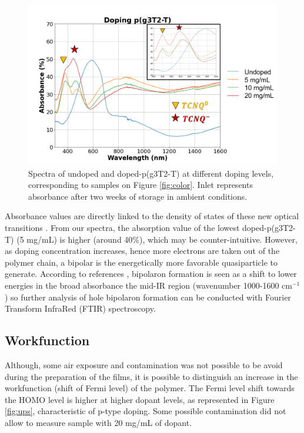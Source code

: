 \begin{figure}[ht]
  \centering
  \includegraphics[width=\textwidth]{Images/pdf/abs+inlet.pdf}
  \caption[Absorbance spectra of different doping levels of p(g3T2-T)]{Spectra of undoped and doped-p(g3T2-T) at different doping levels, corresponding to samples on Figure \ref{fig:color}. Inlet represents absorbance after two weeks of storage in ambient conditions.}
  \label{fig:abs}
\end{figure}

Absorbance values are directly linked to the density of states of these new optical transitions \cite{bredasPolaronsBipolaronsSolitons1985}. From our spectra, the absorption value of the lowest doped-p(g3T2-T) (5 mg/mL) is higher (around 40\%), which may be counter-intuitive. However, as doping concentration increases, hence more electrons are taken out of the polymer chain, a bipolar is the energetically more favorable quasiparticle to generate. According to references \cite{tanTuningOrganicElectrochemical2022}\cite{enenglDopinginducedAbsorptionBands2016}, bipolaron formation is seen as a shift to lower energies in the broad absorbance the mid-IR region (wavenumber 1000-1600 cm$^{-1}$) so further analysis of hole bipolaron formation can be conducted with Fourier Transform InfraRed (FTIR) spectroscopy.
 
\subsection{Workfunction}

Although, some air exposure and contamination was not possible to be avoid during the preparation of the films, it is possible to distinguish an increase in the workfunction (shift of Fermi level) of the polymer. The Fermi level shift towards the HOMO level is higher at higher dopant levels, as represented in Figure \ref{fig:ups}, characteristic of p-type doping. Some possible contamination did not allow to measure sample with 20 mg/mL of dopant.

